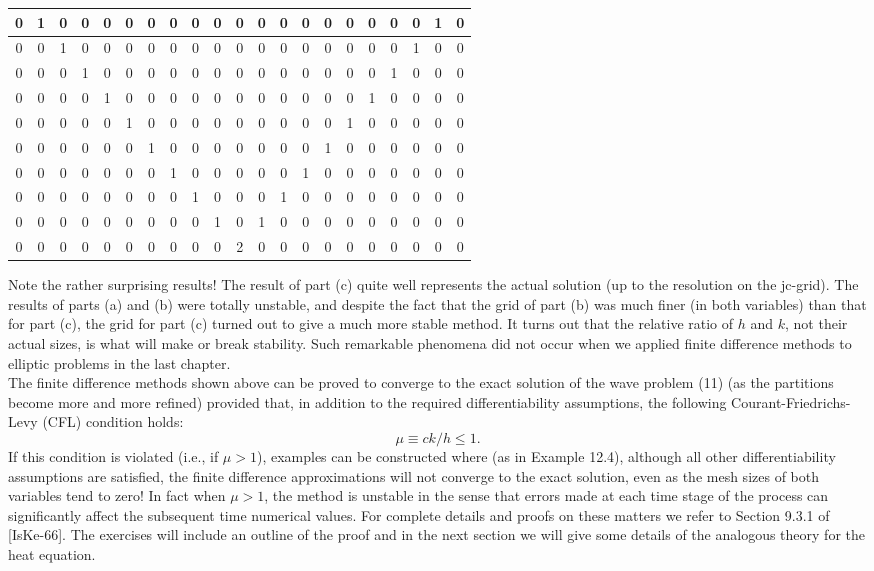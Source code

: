 \documentclass[../main.tex]{subfiles}
\begin{document}
{{\begin{table}[!ht]
\begin{tabular}{|c|c|c|c|c|c|c|c|c|c|c|c|c|c|c|c|c|c|c|c|c|}
       0&1&0&0&0&0&0&0&0&0&0&0&0&0&0&0&0&0&0&1&0\\ \hline
       0&0&1&0&0&0&0&0&0&0&0&0&0&0&0&0&0&0&1&0&0\\ \hline
       0&0&0&1&0&0&0&0&0&0&0&0&0&0&0&0&0&1&0&0&0\\ \hline
       0&0&0&0&1&0&0&0&0&0&0&0&0&0&0&0&1&0&0&0&0\\ \hline
       0&0&0&0&0&1&0&0&0&0&0&0&0&0&0&1&0&0&0&0&0\\ \hline
       0&0&0&0&0&0&1&0&0&0&0&0&0&0&1&0&0&0&0&0&0\\ \hline
       0&0&0&0&0&0&0&1&0&0&0&0&0&1&0&0&0&0&0&0&0\\ \hline
       0&0&0&0&0&0&0&0&1&0&0&0&1&0&0&0&0&0&0&0&0\\ \hline
       0&0&0&0&0&0&0&0&0&1&0&1&0&0&0&0&0&0&0&0&0\\ \hline
       0&0&0&0&0&0&0&0&0&0&2&0&0&0&0&0&0&0&0&0&0\\ \hline
    \end{tabular}
\end{table}
Note the rather surprising results! The result of part (c) quite well represents the actual solution (up to the resolution on the jc-grid). The results of parts (a) and (b) were totally unstable, and despite the fact that the grid of part (b) was much finer (in both variables) than that for part (c), the grid for part (c) turned out to give a much more stable method. It turns out that the relative ratio of $h$ and $k$, not their actual sizes, is what will make or break stability. Such remarkable phenomena did not occur when we applied finite difference methods to elliptic problems in the last chapter. 
\\

The finite difference methods shown above can be proved to converge to the 
exact solution of the wave problem (11) (as the partitions become more and more 
refined) provided that, in addition to the required differentiability assumptions, 
the following Courant-Friedrichs-Levy (CFL) condition holds: 
\begin{equation}
	\mu \equiv ck/h\leqslant1.
\end{equation}
If this condition is violated (i.e., if $\mu > 1$), examples can be constructed where (as in Example 12.4), although all other differentiability assumptions are satisfied, the finite difference approximations will not converge to the exact solution, even as the mesh sizes of both variables tend to zero! In fact when $\mu > 1$, the method is unstable in the sense that errors made at each time stage of the process can significantly affect the subsequent time numerical values. For complete details and proofs on these matters we refer to Section 9.3.1 of [IsKe-66]. The exercises will include an outline of the proof and in the next section we will give some 
details of the analogous theory for the heat equation.
\\

}}
\end{document}
